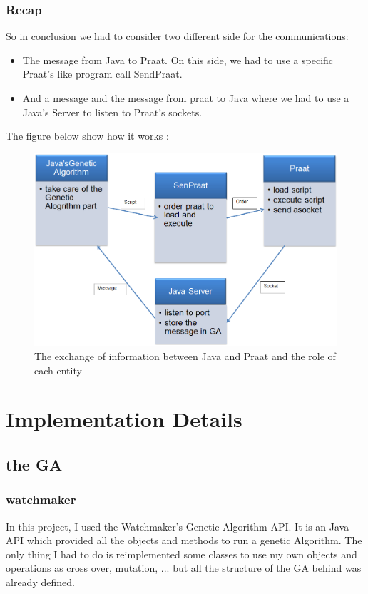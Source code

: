 \documentclass[12pt]{report}
\begin{document}
\section{Recap}
So in conclusion we had to consider two different side for the communications:
\begin{itemize}
\item The message from Java to Praat. On this side, we had to use a specific Praat's like program call SendPraat.
\item And a message and the message from praat to Java where we had to use a Java's Server to listen to Praat's sockets.
\end{itemize}


The figure below show how it works :
\begin{figure}
\begin{center}
\includegraphics[scale=0.6]{resources/architecture.png} 
\end{center}
\caption{The exchange of information between Java and Praat and the role of each entity}
\label{architecture}
\end{figure}

\part{Implementation Details}

\chapter{the GA}

\section{watchmaker}
In this project, I used the Watchmaker's Genetic Algorithm API\cite{ref}. It is an Java API which provided all the objects and methods to run a genetic Algorithm. The only thing I had to do is reimplemented some classes to use my own objects and operations as cross over, mutation, ... but all the structure of the GA behind was already defined.
\end{document}

